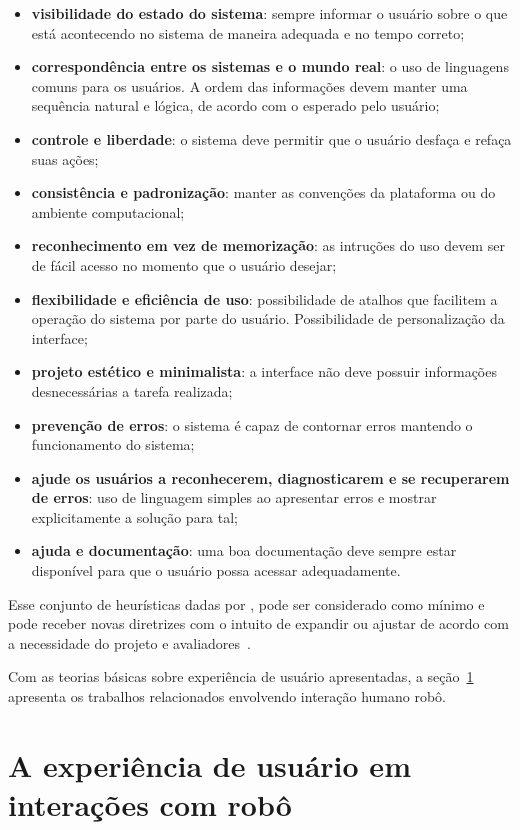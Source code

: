\begin{itemize}
    \item \textbf{visibilidade do estado do sistema}: sempre informar o usuário sobre o que está acontecendo no sistema de maneira adequada e no tempo correto;
    \item \textbf{correspondência entre os sistemas e o mundo real}: o uso de linguagens comuns para os usuários. A ordem das informações devem manter uma sequência natural e lógica, de acordo com o esperado pelo usuário;
    \item \textbf{controle e liberdade}: o sistema deve permitir que o usuário desfaça e refaça suas ações;
    \item \textbf{consistência e padronização}: manter as convenções da plataforma ou do ambiente computacional;
    \item \textbf{reconhecimento em vez de memorização}: as intruções do uso devem ser de fácil acesso no momento que o usuário desejar;
    \item \textbf{flexibilidade e eficiência de uso}: possibilidade de atalhos que facilitem a operação do sistema por parte do usuário. Possibilidade de personalização da interface;
    \item \textbf{projeto estético e minimalista}: a interface não deve possuir informações desnecessárias a tarefa realizada;
    \item \textbf{prevenção de erros}: o sistema é capaz de contornar erros mantendo o funcionamento do sistema;
    \item \textbf{ajude os usuários a reconhecerem, diagnosticarem e se recuperarem de erros}: uso de linguagem simples ao apresentar erros e mostrar explicitamente a solução para tal;
    \item \textbf{ajuda e documentação}: uma boa documentação deve sempre estar disponível para que o usuário possa acessar adequadamente.
\end{itemize}

Esse conjunto de heurísticas dadas por , pode ser considerado como mínimo e pode receber novas diretrizes com o intuito de expandir ou ajustar de acordo com a necessidade do projeto e avaliadores~\cite{barbosa:2010, benyon:2011}.

Com as teorias básicas sobre experiência de usuário apresentadas, a seção~\ref{sec:ihrux} apresenta os trabalhos relacionados envolvendo interação humano robô.

\section{A experiência de usuário em interações com robô}
\label{sec:ihrux}
